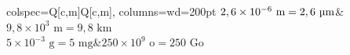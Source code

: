 \documentclass[../main.tex]{subfiles}
\begin{document}
            \begin{exemple}
                \begin{center}
                    \begin{tblr}{   
                        colspec={Q[c,m]Q[c,m]},
                        columns={wd=200pt}
                    }
                        $2,6\times10^{-6}\text{ m}=2,6\text{ \textmu m}$&$9,8\times10^3\text{ m}=9,8\text{ km}$\\
                        $5\times10^{-3}\text{ g}=5\text{ mg}$&$250\times10^9\text{ o}=250\text{ Go}$
                    \end{tblr}
                \end{center}
            \end{exemple}
\end{document}

